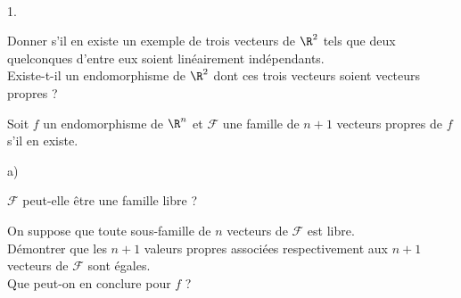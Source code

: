 \documentclass[11pt]{article}%
\begin{document}
\begin{exerciceSP}~
  \begin{noliste}{1.}
    \setlength{\itemsep}{2mm}
  \item Donner s'il en existe un exemple de trois vecteurs de $\R^{2}$
    tels que deux quelconques d'entre eux soient linéairement indépendants.\\
    Existe-t-il un endomorphisme de $\R^{2}$ dont ces trois vecteurs
    soient vecteurs propres ?

  \item Soit $f$ un endomorphisme de $\R^{n}$ et $\mathcal{F}$ une
    famille de $n+1$ vecteurs propres de $f$ s'il en existe.
    \begin{noliste}{a)}
    \setlength{\itemsep}{2mm}
    \item $\mathcal{F}$ peut-elle être une famille libre ?
    \item On suppose que toute sous-famille de $n$ vecteurs de
      $\mathcal{F}$ est libre. \\
      Démontrer que les $n+1$ valeurs propres associées respectivement
      aux $n+1$ vecteurs de $\mathcal{F}$ sont égales.\\
      Que peut-on en conclure pour $f$ ?
    \end{noliste}
  \end{noliste}
\end{exerciceSP}


\end{document}
